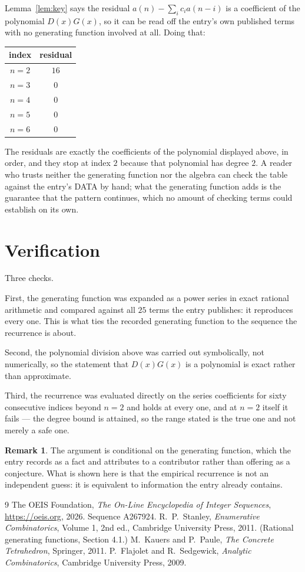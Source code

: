\documentclass[11pt,a4paper]{article}
\theoremstyle{plain}
\theoremstyle{definition}
\newtheorem{remark}[theorem]{Remark}
\begin{document}
Lemma~\ref{lem:key} says the residual $a(n)-\sum_ic_ia(n-i)$ is a coefficient of the
polynomial $D(x)G(x)$, so it can be read off the entry's own published terms with no
generating function involved at all. Doing that:
\begin{center}
\begin{tabular}{cc}
index & residual \\ \hline
$n=2$ & $16$ \\
$n=3$ & $0$ \\
$n=4$ & $0$ \\
$n=5$ & $0$ \\
$n=6$ & $0$
\end{tabular}
\end{center}
The residuals are exactly the coefficients of the polynomial displayed above, in order, and
they stop at index $2$ because that polynomial has degree $2$. A reader who trusts
neither the generating function nor the algebra can check the table against the entry's DATA
by hand; what the generating function adds is the guarantee that the pattern continues, which
no amount of checking terms could establish on its own.

\section{Verification}

Three checks.

First, the generating function was expanded as a power series in exact rational arithmetic and
compared against all $25$ terms the entry publishes: it reproduces every one. This is
what ties the recorded generating function to the sequence the recurrence is about.

Second, the polynomial division above was carried out symbolically, not numerically, so the
statement that $D(x)G(x)$ is a polynomial is exact rather than approximate.

Third, the recurrence was evaluated directly on the series coefficients for sixty consecutive
indices beyond $n=2$ and holds at every one, and at $n=2$ itself it fails --- the
degree bound is attained, so the range stated is the true one and not merely a safe one.

\begin{remark}
The argument is conditional on the generating function, which the entry records as a fact and
attributes to a contributor rather than offering as a conjecture. What is shown here is that
the empirical recurrence is not an independent guess: it is equivalent to information the
entry already contains.
\end{remark}

\begin{thebibliography}{9}
 The OEIS Foundation, \emph{The On-Line Encyclopedia of Integer
Sequences}, \url{https://oeis.org}, 2026. Sequence A267924.
 R.~P.~Stanley, \emph{Enumerative Combinatorics}, Volume 1, 2nd ed.,
Cambridge University Press, 2011. (Rational generating functions, Section 4.1.)
 M.~Kauers and P.~Paule, \emph{The Concrete Tetrahedron}, Springer, 2011.
 P.~Flajolet and R.~Sedgewick, \emph{Analytic Combinatorics}, Cambridge
University Press, 2009.
\end{thebibliography}
\end{document}

